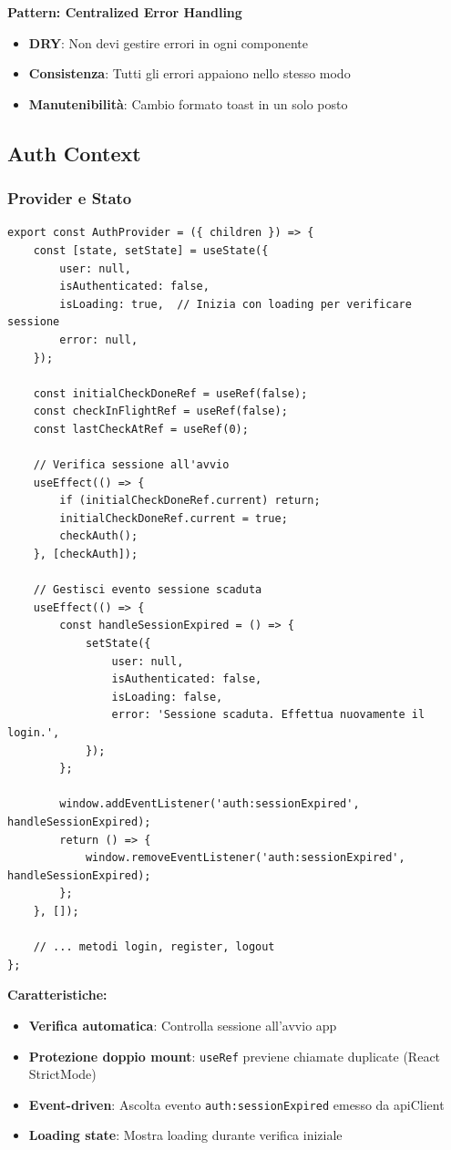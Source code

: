 \documentclass[11pt,a4paper]{article}
\newcommand{\code}[1]{\texttt{#1}}
\begin{document}
\textbf{Pattern: Centralized Error Handling}
\begin{itemize}
    \item \textbf{DRY}: Non devi gestire errori in ogni componente
    \item \textbf{Consistenza}: Tutti gli errori appaiono nello stesso modo
    \item \textbf{Manutenibilità}: Cambio formato toast in un solo posto
\end{itemize}

\subsection{Auth Context}

\subsubsection{Provider e Stato}

\begin{lstlisting}[caption=Auth Context Provider]
export const AuthProvider = ({ children }) => {
    const [state, setState] = useState({
        user: null,
        isAuthenticated: false,
        isLoading: true,  // Inizia con loading per verificare sessione
        error: null,
    });

    const initialCheckDoneRef = useRef(false);
    const checkInFlightRef = useRef(false);
    const lastCheckAtRef = useRef(0);

    // Verifica sessione all'avvio
    useEffect(() => {
        if (initialCheckDoneRef.current) return;
        initialCheckDoneRef.current = true;
        checkAuth();
    }, [checkAuth]);

    // Gestisci evento sessione scaduta
    useEffect(() => {
        const handleSessionExpired = () => {
            setState({
                user: null,
                isAuthenticated: false,
                isLoading: false,
                error: 'Sessione scaduta. Effettua nuovamente il login.',
            });
        };

        window.addEventListener('auth:sessionExpired', handleSessionExpired);
        return () => {
            window.removeEventListener('auth:sessionExpired', handleSessionExpired);
        };
    }, []);

    // ... metodi login, register, logout
};
\end{lstlisting}

\textbf{Caratteristiche:}
\begin{itemize}
    \item \textbf{Verifica automatica}: Controlla sessione all'avvio app
    \item \textbf{Protezione doppio mount}: \code{useRef} previene chiamate duplicate (React StrictMode)
    \item \textbf{Event-driven}: Ascolta evento \code{auth:sessionExpired} emesso da apiClient
    \item \textbf{Loading state}: Mostra loading durante verifica iniziale
\end{itemize}
\end{document}
